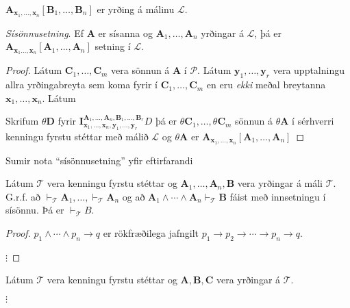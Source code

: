 \documentclass[12pt]{article}
\begin{document}
\begin{setn}
  $\mathbf{A}_{\mathbf{x}_1, \dotsc, \mathbf{x}_n}[\mathbf{B}_1, \dotsc, \mathbf{B}_n]$ er yrðing á málinu $\mathcal{L}$.

  \emph{Sísönnusetning}. Ef $\mathbf{A}$ er sísanna og $\mathbf{A}_1, \dotsc, \mathbf{A}_n$ yrðingar á $\mathcal{L}$, þá er
  $\mathbf{A}_{\mathbf{x}_1 \dotsc, \mathbf{x}_n}[\mathbf{A}_1, \dotsc, \mathbf{A}_n]$ setning
  í $\mathcal{L}$.

  \begin{proof}
    Látum $\mathbf{C}_1, \dotsc, \mathbf{C}_m$ vera sönnun á $\mathbf{A}$ í $\mathcal{P}$.
    Látum $\mathbf{y}_1, \dotsc, \mathbf{y}_r$ vera upptalningu allra yrðingabreyta sem
    koma fyrir í $\mathbf{C}_1, \dotsc, \mathbf{C}_m$ en eru \emph{ekki}
    meðal breytanna
    $\mathbf{x}_1, \dotsc, \mathbf{x}_n$. Látum

    Skrifum $\theta \mathbf{D}$ fyrir $\mathbf{I}^{\mathbf{A}_1, \dotsc, \mathbf{A}_n, \mathbf{B}_1, \dotsc, \mathbf{B}_r}_{\mathbf{x}_1, \dotsc, \mathbf{x}_n, \mathbf{y}_1, \dotsc, \mathbf{y}_r} D$
    þá er $\theta \mathbf{C}_1, \dotsc, \theta \mathbf{C}_m$ sönnun á $\theta \mathbf{A}$ í sérhverri kenningu
    fyrstu stéttar með málið $\mathcal{L}$ og $\theta \mathbf{A}$ er
    $\mathbf{A}_{\mathbf{x}_1, \dotsc, \mathbf{x}_n} [\mathbf{A}_1, \dotsc, \mathbf{A}_n]$
  \end{proof}
\end{setn}

Sumir nota ``sísönnusetning'' yfir eftirfarandi

\begin{setn}[Fylgisetning]
  Látum $\mathcal{T}$ vera kenningu fyrstu stéttar og $\mathbf{A}_1, \dotsc, \mathbf{A}_n, \mathbf{B}$ vera
yrðingar á máli $\mathcal{T}$. G.r.f. að
$\vdash_{\mathcal{T}} \mathbf{A}_1, \dotsc, \vdash_{\mathcal{T}} \mathbf{A}_n$
og að $\mathbf{A}_1 \wedge \dotsb \wedge \mathbf{A}_n \vdash_{\mathcal{T}} \mathbf{B}$
fáist með innsetningu í sísönnu. Þá er $\vdash_{\mathcal{T}}B$.

  \begin{proof}
   $p_1 \wedge \dotsb \wedge p_n \rightarrow q$
   er rökfræðilega jafngilt
   $p_1 \rightarrow p_2 \rightarrow \dotsb \rightarrow p_n \rightarrow q$.

   $\vdots$
  \end{proof}
\end{setn}


\begin{setn}[Fylgisetning]

  Látum $\mathcal{T}$ vera kenningu fyrstu stéttar og $\mathbf{A}, \mathbf{B}, \mathbf{C}$
  vera yrðingar á $\mathcal{T}$.

  $\vdots$
\end{setn}
\end{document}
